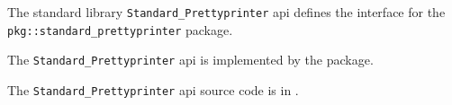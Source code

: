 
The standard library {\tt Standard\_Prettyprinter} api defines the interface for the {\tt pkg::standard\_prettyprinter} package.

The {\tt Standard\_Prettyprinter} api is implemented by the 
 package.

The {\tt Standard\_Prettyprinter} api source code is in .
